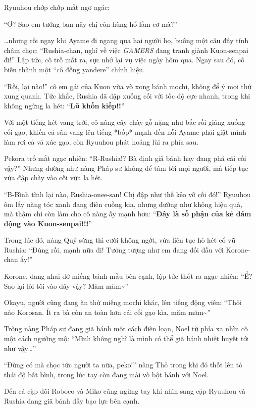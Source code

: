 \documentclass[../main.tex]{subfiles}
\begin{document}
Ryuuhou chớp chớp mắt ngơ ngác:

``Ơ? Sao em tưởng ban nãy chị còn hùng hổ lắm cơ mà?''

\dots nhưng rồi ngay khi Ayame đi ngang qua hai người họ, buông một câu đầy tính châm chọc: ``Rushia-chan, nghĩ về việc \textit{GAMERS} đang tranh giành Kuon-senpai đi!'' Lập tức, cô trố mắt ra, sực nhớ lại vụ việc ngày hôm qua. Ngay sau đó, cô biến thành một ``cô đồng yandere'' chính hiệu.

``Rồi, lại nào!'' cô em gái của Kuon vừa vò xong bánh mochi, không để ý mọi thứ xung quanh. Tức khắc, Rushia đã đập xuống cối với tốc độ cực nhanh, trong khi không ngừng la hét: ``\textbf{Lũ khốn kiếp!!}''

Với một tiếng hét vang trời, cô nâng cây chày gỗ nặng như bấc rồi giáng xuống cối gạo, khiến cả sân vang lên tiếng *bốp* mạnh đến nỗi Ayame phải giật mình làm rơi cả vá xúc gạo, còn Ryuuhou phát hoảng lùi ra phía sau.

Pekora trố mắt ngạc nhiên: ``R-Rushia!? Bà định giã bánh hay đang phá cái cối vậy?'' Nhưng dường như nàng Pháp sư không để tâm tới mọi người, mà tiếp tục vừa đập chày vào cối vừa la hét.

``B-Bình tĩnh lại nào, Rushia-onee-san! Chị đập như thế kẻo vỡ cối đó!'' Ryuuhou ôm lấy nàng tóc xanh đang điên cuồng kia, nhưng dường như không hiệu quả, mà thậm chí còn làm cho cô nàng ấy mạnh hơn: ``\textbf{Đây là số phận của kẻ dám động vào Kuon-senpai!!!}''

Trong lúc đó, nàng Quỷ sừng thì cười không ngớt, vừa liên tục hò hét cổ vũ Rushia: ``Đúng rồi, mạnh nữa đi! Tưởng tượng như em đang đối đầu với Korone-chan ấy!''

Korone, đang nhai dở miếng bánh mẫu bên cạnh, lập tức thốt ra ngạc nhiên: ``Ể? Sao lại lôi tôi vào đây vậy? Măm măm\~{}''

Okayu, người cũng đang ăn thử miếng mochi khác, lên tiếng động viên: ``Thôi nào Korosan. Ít ra bà còn an toàn hơn cái cối gạo kìa, măm măm\~{}''

Trông nàng Pháp sư đang giã bánh một cách điên loạn, Noel từ phía xa nhìn cô một cách ngưỡng mộ: ``Mình không nghĩ là mình có thể giã bánh nhiệt huyết tới như vậy\dots''

``Đừng có mà chọc tức người ta nữa, peko!'' nàng Thỏ trong khi đó thốt lên tỏ thái độ bất bình, trong lúc tay còn đang mải vò bột bánh với Noel.

Đến cả cặp đôi Roboco và Miko cũng ngừng tay khi nhìn sang cặp Ryuuhou và Rushia đang giã bánh đầy bạo lực bên cạnh.
\end{document}
